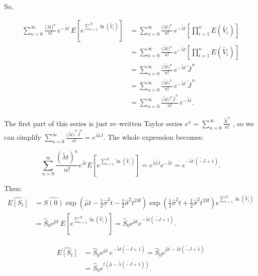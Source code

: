 \documentclass[12pt,a4paper]{report}
\numberwithin{equation}{section}
\begin{document}
So,

\[
\begin{aligned}
\sum_{n=0}^{\infty}\frac{\bigl(\widetilde{\lambda t}\bigr)^{n}}{n!}\,e^{-\widetilde{\lambda t}}\,
E\!\left[e^{\sum_{i=1}^{N}\ln(\widetilde{V_i})}\right]
&=\sum_{n=0}^{\infty}\frac{\bigl(\widetilde{\lambda t}\bigr)^{n}}{n!}\,e^{-\widetilde{\lambda t}}
\left[\prod_{i=1}^{n}E(\widetilde{V_i})\right] \\
&=\sum_{n=0}^{\infty}\frac{\bigl(\widetilde{\lambda t}\bigr)^{n}}{n!}\,e^{-\widetilde{\lambda t}}
\left[\prod_{i=1}^{n}E(\widetilde{V_i})\right] \\
&=\sum_{n=0}^{\infty}\frac{\bigl(\widetilde{\lambda t}\bigr)^{n}}{n!}\,e^{-\widetilde{\lambda t}}\,
\widetilde{J}^{\,n} \\
&=\sum_{n=0}^{\infty}\frac{\bigl(\widetilde{\lambda t}\bigr)^{n}}{n!}\,e^{-\widetilde{\lambda t}}\,
\widetilde{J}^{\,n} \\
&=\sum_{n=0}^{\infty}\frac{\bigl(\widetilde{\lambda t}\bigr)^{n}\widetilde{J}^{\,n}}{n!}\,
e^{-\widetilde{\lambda t}} .
\end{aligned}
\]


The first part of this series is just re--written Taylor series
\(e^{x} = \sum_{n = 0}^{\infty}\frac{{\widetilde{X}}^{n}}{n!}\) , so we
can simplify
\(\sum_{n = 0}^{\infty}{\frac{({\widetilde{\lambda t})}^{n}{\widetilde{J}}^{n}}{n!} = e^{\widetilde{\lambda tJ}}}\).
The whole expression becomes:

\[
\sum_{n=0}^{\infty}\frac{(\widetilde{\lambda t})^{n}}{n!}e^{\widetilde{\lambda t}}
E\!\left[e^{\sum_{i=1}^{N}\ln(\widetilde{V_i})}\right]
= e^{\widetilde{\lambda t}\widetilde{J}}e^{-\widetilde{\lambda t}}
= e^{-\widetilde{\lambda t}\,(\widetilde{-J}+1)}.
\]


Then:
\[
\begin{aligned}
\widehat{E\!\left[S_t\right]}
&= \widehat{S(0)}\exp\!\left(\widehat{\mu}t-\frac{1}{2}\widehat{\sigma}^{2}t-\frac{1}{2}\widehat{\sigma}^{2}t^{2H}\right)
\exp\!\left(\frac{1}{2}\widehat{\sigma}^{2}t+\frac{1}{2}\widehat{\sigma}^{2}t^{2H}\right)
e^{\sum_{i=1}^{N}\ln(\widetilde{V_i})} \\
&= \widehat{S}_{0}e^{\widehat{\mu}t}\,E\!\left[e^{\sum_{i=1}^{N}\ln(\widetilde{V_i})}\right]
= \widehat{S}_{0}e^{\widehat{\mu}t}e^{-\widetilde{\lambda t}\left(\widetilde{-J}+1\right)} .
\end{aligned}
\]


\[
\begin{aligned}
\widehat{E\!\left[S_t\right]}
&= \widehat{S}_{0}e^{\widehat{\mu}t}\,e^{-\widetilde{\lambda t}\left(\widetilde{-J}+1\right)}
= \widehat{S}_{0}e^{\widehat{\mu}t-\widetilde{\lambda t}\left(\widetilde{-J}+1\right)} \\
&= \widehat{S}_{0}e^{t\left(\widehat{\mu}-\widetilde{\lambda}\left(\widetilde{-J}+1\right)\right)} .
\end{aligned}
\]
\end{document}
